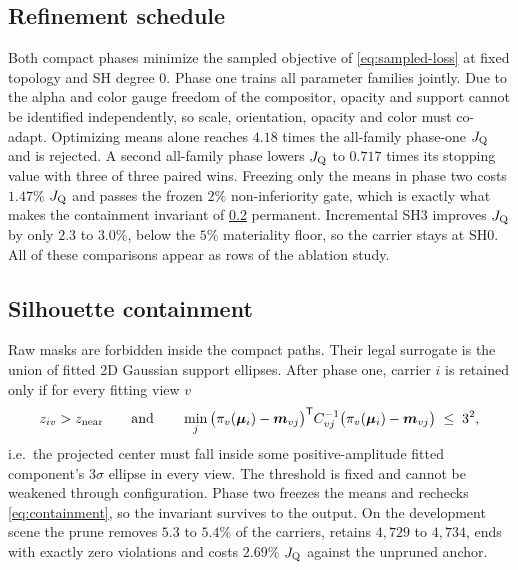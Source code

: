 \subsection{Refinement schedule}
\label{sec:phases}

Both compact phases minimize the sampled objective of \cref{eq:sampled-loss} at fixed
topology and SH degree 0.  Phase one trains all parameter families jointly.  Due to the
alpha and color gauge freedom of the compositor, opacity and support cannot be identified
independently, so scale, orientation, opacity and color must co-adapt.  Optimizing means
alone reaches $4.18$ times the all-family phase-one $J_{\mathrm{Q}}$ and is rejected.  A second
all-family phase lowers $J_{\mathrm{Q}}$ to $0.717$ times its stopping value with three of three
paired wins.  Freezing only the means in phase two costs $1.47\%$ $J_{\mathrm{Q}}$ and passes the
frozen $2\%$ non-inferiority gate, which is exactly what makes the containment invariant
of \cref{sec:containment} permanent.  Incremental SH3 improves $J_{\mathrm{Q}}$ by only $2.3$ to
$3.0\%$, below the $5\%$ materiality floor, so the carrier stays at SH0.  All of these
comparisons appear as rows of the ablation study.

\subsection{Silhouette containment}
\label{sec:containment}

Raw masks are forbidden inside the compact paths.  Their legal surrogate is the union of
fitted 2D Gaussian support ellipses.  After phase one, carrier $i$ is retained only if for
every fitting view $v$
\begin{equation}
  z_{iv} > z_{\text{near}}
  \qquad\text{and}\qquad
  \min_j \big(\pi_v(\bm{\mu}_i) - \bm{m}_{vj}\big)^{\mathsf{T}} C_{vj}^{-1}
         \big(\pi_v(\bm{\mu}_i) - \bm{m}_{vj}\big) \;\le\; 3^2,
  \label{eq:containment}
\end{equation}
i.e.\ the projected center must fall inside some positive-amplitude fitted component's
$3\sigma$ ellipse in every view.  The threshold is fixed and cannot be weakened through
configuration.  Phase two freezes the means and rechecks \cref{eq:containment}, so the
invariant survives to the output.  On the development scene the prune removes $5.3$ to
$5.4\%$ of the carriers, retains $4{,}729$ to $4{,}734$, ends with exactly zero violations
and costs $2.69\%$ $J_{\mathrm{Q}}$ against the unpruned anchor.

